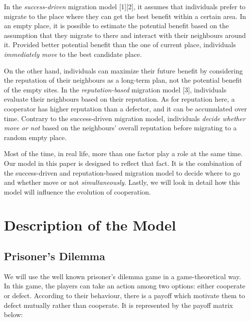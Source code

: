 \documentclass[11pt]{article}
\begin{document}
In the \textit{success-driven} migration model [1][2], it assumes that individuals prefer to migrate to the place where they can get the best benefit within a certain area. In an empty place, it is possible to estimate the potential benefit based on the assumption that they migrate to there and interact with their neighbours around it. Provided better potential benefit than the one of current place, individuals \textit{immediately move} to the best candidate place.  

On the other hand, individuals can maximize their future benefit by considering the reputation of their neighbours as a long-term plan, not the potential benefit of the empty sites. In the \textit{reputation-based} migration model [3], individuals evaluate their neighbours based on their reputation. As for reputation here, a cooperator has higher reputation than a defector, and it can be accumulated over time. Contrary to the success-driven migration model, individuals \textit{decide whether move or not} based on the neighbours' overall reputation before migrating to a random empty place.

Most of the time, in real life, more than one factor play a role at the same time. Our model in this paper is designed to reflect that fact. It is the combination of the success-driven and reputation-based migration model to decide where to go and whether move or not \textit{simultaneously}. Lastly, we will look in detail how this model will influence the evolution of cooperation.


\section{Description of the Model}
\subsection{Prisoner's Dilemma}

We will use the well known prisoner's dilemma game in a game-theoretical way. In this game, the players can take an action among two options: either cooperate or defect. According to their behaviour, there is a payoff which motivate them to defect mutually rather than cooperate. It is represented by the payoff matrix below:
\end{document}
